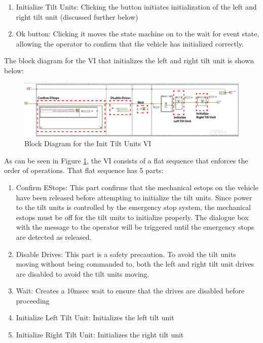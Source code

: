 \begin{enumerate}
\item Initialize Tilt Units: Clicking the button initiates initialization of the left and right tilt unit (discussed further below)
\item Ok button: Clicking it moves the state machine on to the wait for event state, allowing the operator to confirm that the vehicle has initialized correctly.
\end{enumerate}

\noindent The block diagram for the VI that initializes the left and right tilt unit is shown below:

 \begin{figure}[h!]
\centering
\includegraphics[scale=0.3]{Photos/InitTiltUnits_annotated.png}
\caption{Block Diagram for the Init Tilt Units VI}
\label{fig:inittiltunits}
\end{figure}

\noindent As can be seen in Figure \ref{fig:inittiltunits}, the VI consists of a flat sequence that enforces the order of operations. That flat sequence has 5 parts:

\begin{enumerate}
\item Confirm EStops: This part confirms that the mechanical estops on the vehicle have been released before attempting to initialize the tilt units. Since power to the tilt units is controlled by the emergency stop system, the mechanical estops must be off for the tilt units to initialize properly. The dialogue box with the message to the operator will be triggered until the emergency stops are detected as released.
\item Disable Drives: This part is a safety precaution. To avoid the tilt units moving without being commanded to, both the left and right tilt unit drives are disabled to avoid the tilt units moving.
\item Wait: Creates a 10msec wait to ensure that the drives are disabled before proceeding
\item Initialize Left Tilt Unit: Initializes the left tilt unit
\item Initialize Right Tilt Unit: Initializes the right tilt unit
\end{enumerate}

